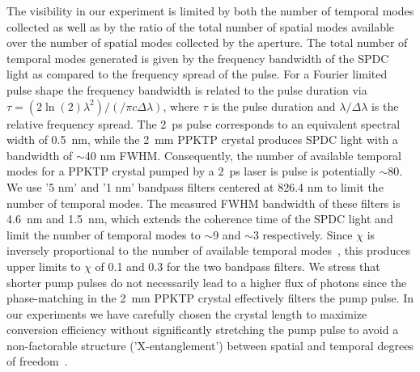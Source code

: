 The visibility in our experiment is limited by both the number of temporal modes collected as well as by the ratio of the total number of spatial modes available over the number of spatial modes collected by the aperture. The total number of temporal modes generated is given by the frequency bandwidth of the SPDC light as compared to the frequency spread of the pulse. For a Fourier limited pulse shape the frequency bandwidth is related to the pulse duration via $\tau = (2 \ln(2) \lambda^2)/(/\pi c \Delta \lambda)$, where $\tau$ is the pulse duration and $\lambda/\Delta \lambda$ is the relative frequency spread. The 2~ps pulse corresponds to an equivalent spectral width of 0.5~nm, while the 2~mm PPKTP crystal produces SPDC light with a bandwidth of $\sim$40 nm FWHM. Consequently, the number of available temporal modes for a PPKTP crystal pumped by a 2~ps laser is pulse is potentially $\sim$80. We use '5 nm' and '1 nm' bandpass filters centered at 826.4 nm to limit the number of temporal modes. The measured FWHM bandwidth of these filters is 4.6~nm and 1.5~nm, which extends the coherence time of the SPDC light and limit the number of temporal modes to $\sim$9 and $\sim$3 respectively. Since $\chi$ is inversely proportional to the number of available temporal modes~\cite{Riedmatten2004}, this produces upper limits to $\chi$ of 0.1 and 0.3 for the two bandpass filters. We stress that shorter pump pulses do not necessarily lead to a higher flux of photons since the phase-matching in the 2~mm PPKTP crystal effectively filters the pump pulse. In our experiments we have carefully chosen the crystal length to maximize conversion efficiency without significantly stretching the pump pulse to avoid a non-factorable structure ('X-entanglement') between spatial and temporal degrees of freedom~\cite{Gatti:PRL2009}.

